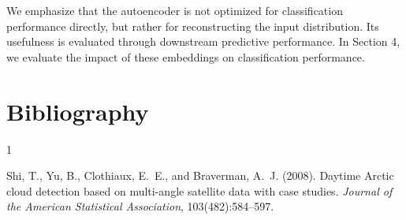 \documentclass[10pt,letterpaper]{article}
\begin{document}
We emphasize that the autoencoder is not optimized for classification performance directly, but rather for reconstructing the input distribution. Its usefulness is evaluated through downstream predictive performance. In Section 4, we evaluate the impact of these embeddings on classification performance.



\newpage
\section{Bibliography}
\begin{thebibliography}{1}

Shi, T., Yu, B., Clothiaux, E.~E., and Braverman, A.~J. (2008).
\newblock Daytime {Arctic} cloud detection based on multi-angle satellite data with case studies.
\newblock \textit{Journal of the American Statistical Association}, 103(482):584--597.

\end{thebibliography}
\end{document}

